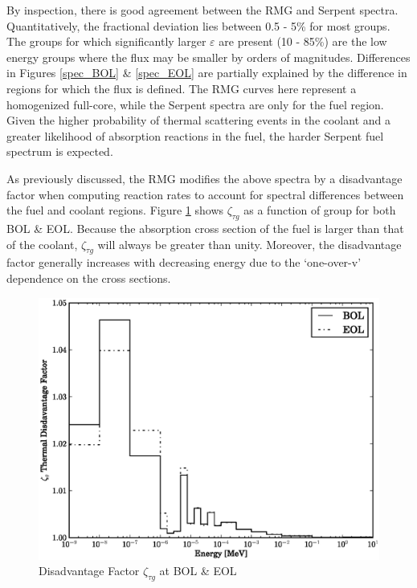 By inspection, there is good agreement between the RMG and Serpent spectra.  Quantitatively, 
the fractional deviation lies between 0.5 - 5\% for most groups.  The groups for which 
significantly larger $\varepsilon$ are present (10 - 85\%) are  the low energy groups 
where the flux may be smaller by orders of magnitudes.  Differences in Figures \ref{spec_BOL} \& 
\ref{spec_EOL} are partially explained by the difference in regions for which the flux is defined.
The RMG curves here represent a homogenized full-core, while the Serpent spectra are only for the 
fuel region.  Given the higher probability of thermal scattering events in the coolant and a greater likelihood of
absorption reactions in the fuel, the harder Serpent fuel spectrum is expected.

As previously discussed, the RMG modifies the above spectra by a disadvantage factor when computing 
reaction rates to account for spectral differences between the fuel and coolant regions.
Figure \ref{zeta_BOL_EOL} shows $\zeta_{\tau g}$ as a function of group for both BOL \& EOL.
Because the absorption cross section of the fuel is larger than that of the coolant, 
$\zeta_{\tau g}$ will always be greater than unity.  Moreover, the disadvantage factor generally
increases with decreasing energy due to the `one-over-v' dependence on the cross sections. 

\begin{figure}[htbp]
\caption{Disadvantage Factor $\zeta_{\tau g}$ at BOL \& EOL}
\label{zeta_BOL_EOL}
\begin{center}
\includegraphics[scale=0.5]{multigroup_method/figs/benchmark/zeta.eps}
\end{center}
\end{figure}


